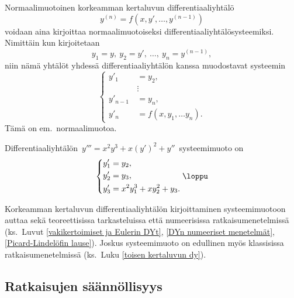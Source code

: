 Normaalimuotoinen korkeamman kertaluvun differentiaaliyhtälö
\[
y^{(n)}=f(x,y',\ldots,y^{(n-1)})
\]
voidaan aina kirjoittaa normaalimuotoiseksi differentiaaliyhtälösysteemiksi. Nimittäin kun 
kirjoitetaan
\[
y_1=y,\ y_2=y',\ \ldots,\ y_n=y^{(n-1)},
\]
niin nämä yhtälöt yhdessä differentiaaliyhtälön kanssa muodostavat systeemin
\[
 \left\{ \begin{aligned} 
         y'_1 \quad  &= y_2, \\
                     &\vdots \\
         y'_{n-1}\,  &= y_n, \\
         y'_n \quad  &= f(x,y_1, \ldots y_n).
         \end{aligned} \right.
\]
Tämä on em.\ normaalimuotoa.
\begin{Exa} Differentiaaliyhtälön $\,y'''=x^2y^3+x(y')^2+y''\,$ systeemimuoto on
\[
 \left\{ \begin{aligned} 
         y'_1 &= y_2, \\
         y'_2 &= y_3, \\
         y'_3 &= x^2y_1^3+xy_2^2+y_3.
         \end{aligned} \right. \loppu
\]
\end{Exa}

Korkeamman kertaluvun differentiaaliyhtälön kirjoittaminen systeemimuotoon auttaa sekä 
teoreettisissa tarkasteluissa että numeerisissa ratkaisumenetelmissä (ks.\ Luvut 
\ref{vakikertoimiset ja Eulerin DYt}, \ref{DYn numeeriset menetelmät},
\ref{Picard-Lindelöfin lause}). Joskus systeemimuoto on edullinen myös klassisissa
ratkaisumenetelmissä (ks.\ Luku \ref{toisen kertaluvun dy}).

\subsection*{Ratkaisujen säännöllisyys}

